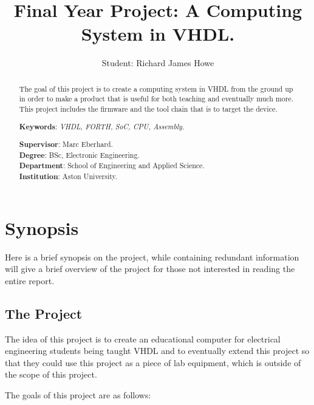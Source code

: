 \documentclass	[a4paper, 10pt]	{article}
\title		{Final Year Project: A Computing System in VHDL.}
\author		{Student: Richard James Howe}%
\begin{document}
	\maketitle
	\hrulefill

	\begin{abstract}
    The goal of this project is to create a computing system in VHDL from the
    ground up in order to make a product that is useful for both teaching and
    eventually much more. This project includes the firmware and the tool chain
    that is to target the device.

      \smallskip
      \begin{center}
      \noindent \textbf{Keywords}: \emph{VHDL, FORTH, SoC, CPU, Assembly.}
      \end{center}

      \smallskip
      \begin{center}
      \noindent \textbf{Supervisor}: Marc Eberhard.\\
      \noindent \textbf{Degree}: BSc, Electronic Engineering.\\
      \noindent \textbf{Department}: School of Engineering and Applied Science.\\
      \noindent \textbf{Institution}: Aston University.
      \end{center}

	\end{abstract}

  \clearpage
	\tableofcontents
  \clearpage
  \listoffigures
  \clearpage
  \section{Synopsis}

    Here is a brief synopsis on the project, while containing redundant information
    will give a brief overview of the project for those not interested in reading
    the entire report.

    \subsection{The Project}

    The idea of this project is to create an educational computer for electrical engineering
    students being taught VHDL and to eventually extend this project so that they could
    use this project as a piece of lab equipment, which is outside of the scope of this project.

    The goals of this project are as follows:
\end{document}
